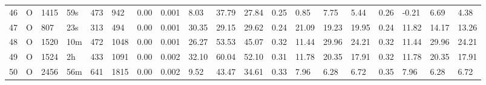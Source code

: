 \begin{tabular}{rllllllrlllllllllll}
46 & O & 1415 & 59s & 473 & 942 & 0.00 & 0.001 & 8.03 & 37.79 & 27.84 & 0.25 & 0.85 & 7.75 & 5.44 & 0.26 & -0.21 & 6.69 & 4.38 \\
47 & O & 807 & 23s & 313 & 494 & 0.00 & 0.001 & 30.35 & 29.15 & 29.62 & 0.24 & 21.09 & 19.23 & 19.95 & 0.24 & 11.82 & 14.17 & 13.26 \\
48 & O & 1520 & 10m & 472 & 1048 & 0.00 & 0.001 & 26.27 & 53.53 & 45.07 & 0.32 & 11.44 & 29.96 & 24.21 & 0.32 & 11.44 & 29.96 & 24.21 \\
49 & O & 1524 & 2h & 433 & 1091 & 0.00 & 0.002 & 32.10 & 60.04 & 52.10 & 0.31 & 11.78 & 20.35 & 17.91 & 0.32 & 11.78 & 20.35 & 17.91 \\
50 & O & 2456 & 56m & 641 & 1815 & 0.00 & 0.002 & 9.52 & 43.47 & 34.61 & 0.33 & 7.96 & 6.28 & 6.72 & 0.35 & 7.96 & 6.28 & 6.72 \\
\bottomrule
\end{tabular}
